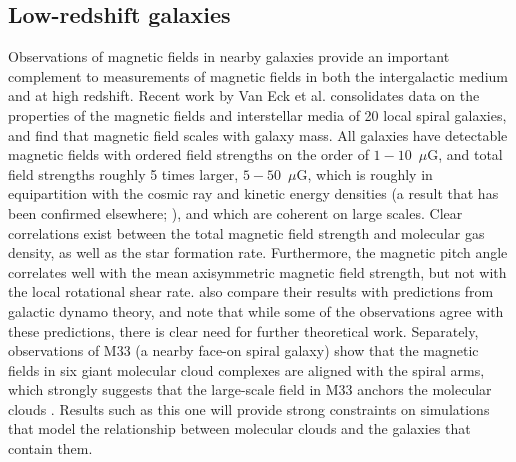 
%

\vspace{-3mm}
\subsection{Low-redshift galaxies}
\label{sec:lowz}
\vspace{-2mm}



Observations of magnetic fields in nearby galaxies provide an
important complement to measurements of magnetic fields in both the
intergalactic medium and at high redshift.  Recent work by Van Eck
et al. \cite{2014arXiv1411.1386V} consolidates data on the properties
of the magnetic fields and interstellar media of 20 local spiral
galaxies, and \citet{Tabatabaei16} find that magnetic field scales with galaxy
mass.
All galaxies have detectable
magnetic fields with ordered field strengths on the order of $1-10$~$\mu$G, and
total field strengths roughly 5 times larger, $5-50$~$\mu$G, which is
roughly in equipartition with the cosmic ray and kinetic energy
densities (a result that has been confirmed elsewhere; \cite{Mao12,
Beck13}), and which are coherent on large scales.  Clear correlations
exist between the total magnetic field strength and molecular gas
density, as well as the star formation rate.  Furthermore, the
magnetic pitch angle correlates well with the mean axisymmetric
magnetic field strength, but not with the local rotational shear rate.
\citet{2014arXiv1411.1386V} also compare their results with predictions from galactic
dynamo theory, and note that while some of the observations agree with
these predictions, there is clear need for further theoretical work.
Separately, observations of M33 (a nearby face-on spiral galaxy) show
that the magnetic fields in six giant molecular cloud complexes are
aligned with the spiral arms, which strongly suggests that the
large-scale field in M33 anchors the molecular clouds
\citep{2011Natur.479..499L}.  Results such as this one will provide
strong constraints on simulations that model the relationship between
molecular clouds and the galaxies that contain them. 

